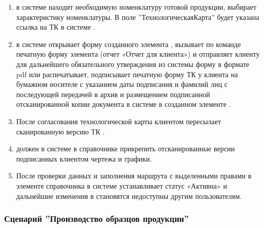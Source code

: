\begin{enumerate}
\item \manager в системе \gofro находит необходимую номенклатуру готовой продукции, выбирает характеристику номенклатуры. В поле ''ТехнологическаяКарта'' будет указана ссылка на ТК в системе \gofro.
\item \manager  в системе  \gofro открывает форму созданного элемента , вызывает по команде  печатную форму элемента  (отчет «Отчет для клиента») и отправляет клиенту для дальнейшего обязательного утверждения из системы \gofro форму в формате pdf или распечатывает, подписывает печатную форму ТК у клиента на бумажном носителе с указанием даты подписания и фамилий лиц с последующей передачей в архив и размещением подписанной отсканированной копии документа в системе \gofro в созданном элементе .
 \item	После согласования технологической карты клиентом \manager  пересылает сканированную версию ТК  \tehnolog. 
 \item \tehnolog должен в системе \gofro в справочнике  прикрепить отсканированные версии подписанных клиентом чертежа и графики.
\item	После проверки данных и заполнения маршрута \tehnolog  
 с выделенными правами в элементе справочника
 в системе \gofro устанавливает статус «Активна» и дальнейшие изменения в  становятся недоступны другим пользователям.

\end{enumerate}




 \subsubsection{Сценарий ''Производство образцов продукции''}

 \label{bp:pm_3}

